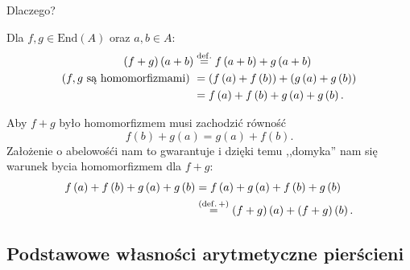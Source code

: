 \begin{enumerate}[label=\arabic*)]
\begin{remark}[Po co abelowość $A$?]
		 Dlaczego?

		Dla $f,g \in \text{End}\left( A \right) $ oraz $a,b\in A$:
		\begin{align*}
			\left( f+g \right) \left( a+b \right) &\overset{\operatorname{def.}}{=} f\left( a+b \right) + g\left( a+b \right)\\
			\text{($f,g$ są homomorfizmami) } &= \left( f\left( a \right) + f\left( b \right)  \right) + \left( g\left( a \right) + g\left( b \right)  \right) \\
						 &= f\left( a \right) + f\left( b \right) + g\left( a \right) + g\left( b \right) 
		.\end{align*}

		Aby $f+g$ było homomorfizmem musi zachodzić równość
		\[
		f\left( b \right) + g\left( a \right) = g\left( a \right) + f\left( b \right) 
		.\] 
		Założenie o abelowośći nam to gwarantuje i dzięki temu ,,domyka'' nam się warunek bycia homomorfizmem dla $f+g$: 
		\begin{align*}
			f\left( a \right) + f\left( b \right) + g\left( a \right) + g\left( b \right) &= f\left( a \right) + g\left( a \right) + f\left( b \right) + g\left( b \right) \\
						      &\overset{(\operatorname{def.} +)}{=} \left( f+g \right) \left( a \right) + \left( f + g \right) \left( b \right) 
		.\end{align*}
		\end{remark} 
\end{enumerate}

\subsection*{Podstawowe własności arytmetyczne pierścieni}


